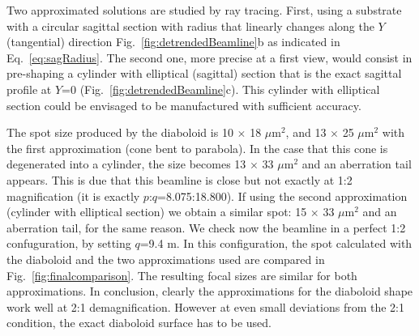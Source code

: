 \documentclass{iucr}              %
\begin{document}
Two approximated solutions are studied by ray tracing. First, using a substrate with a circular sagittal section with radius that linearly changes along the $Y$ (tangential) direction Fig.~\ref{fig:detrendedBeamline}b as indicated in Eq.~\ref{eq:sagRadius}. The second one, more precise at a first view, would consist in pre-shaping a cylinder with elliptical (sagittal) section that is the exact sagittal profile at $Y$=0 (Fig.~\ref{fig:detrendedBeamline}c).  This cylinder with elliptical section could be envisaged to be manufactured with sufficient accuracy. 

The spot size produced by the diaboloid is 10 $\times$ 18 $\mu$m$^2$, and 13 $\times$ 25 $\mu$m$^2$ with the first approximation (cone bent to parabola). In the case that this cone is degenerated into a cylinder, the size becomes 13 $\times$ 33 $\mu$m$^2$ and an aberration tail appears. This is due that this beamline is close but not exactly at 1:2 magnification (it is exactly $p$:$q$=8.075:18.800). If using the second approximation (cylinder with elliptical section) we obtain a similar spot: 15 $\times$ 33 $\mu$m$^2$ and an aberration tail, for the same reason. We check now the beamline in a perfect 1:2 confuguration, by setting $q$=9.4 m. In this configuration, the spot calculated with the diaboloid and the two approximations used are compared in Fig.~\ref{fig:finalcomparison}. The resulting focal sizes are similar for both approximations. In conclusion, clearly the approximations for the diaboloid shape work well at 2:1 demagnification. However at even small deviations from the 2:1 condition, the exact diaboloid surface has to be used.

\end{document}
